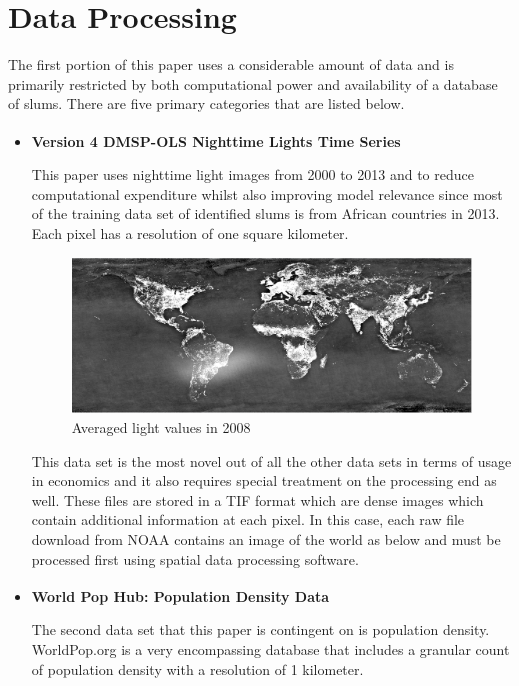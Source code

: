 \section{Data Processing}

The first portion of this paper uses a considerable amount of data and is primarily restricted by both computational power and availability of a database of slums. There are five primary categories that are listed below.
\begin{itemize}
    \item \textbf{Version 4 DMSP-OLS Nighttime Lights Time Series}\textsuperscript{\cite{lightdata}}
    
    This paper uses nighttime light images from 2000 to 2013 and to reduce computational expenditure whilst also improving model relevance since most of the training data set of identified slums is from African countries in 2013. Each pixel has a resolution of one square kilometer.
    
    \begin{figure}[ht]
        \centering
        \includegraphics[scale = 0.3]{Graphics/F162008 avg lights pic.png}
        \caption{Averaged light values in 2008}
        \label{fig:F162008}
    \end{figure}
    
    This data set is the most novel out of all the other data sets in terms of usage in economics and it also requires special treatment on the processing end as well. These files are stored in a TIF format which are dense images which contain additional information at each pixel. In this case, each raw file download from NOAA contains an image of the world as below and must be processed first using spatial data processing software.    
    
    \item \textbf{World Pop Hub: Population Density Data}\textsuperscript{\cite{popdata}}
    
    The second data set that this paper is contingent on is population density. WorldPop.org is a very encompassing database that includes a granular count of population density with a resolution of 1 kilometer.
        

\end{itemize}
